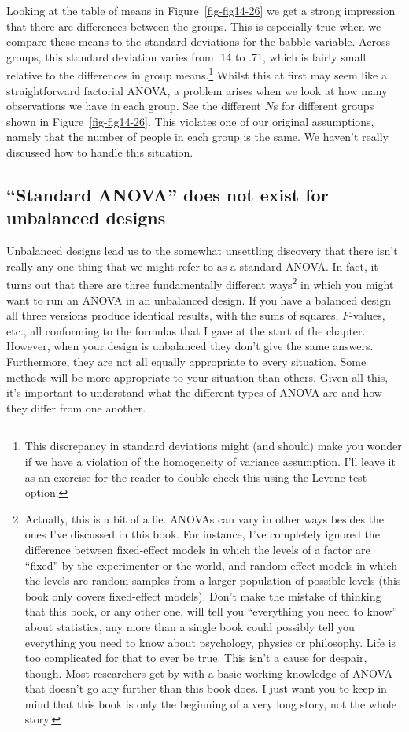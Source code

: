 \documentclass[
  a4paper,
]{book}
\begin{document}
Looking at the table of means in Figure~\ref{fig-fig14-26} we get a
strong impression that there are differences between the groups. This is
especially true when we compare these means to the standard deviations
for the babble variable. Across groups, this standard deviation varies
from .14 to .71, which is fairly small relative to the differences in
group means.\footnote{This discrepancy in standard deviations might (and
  should) make you wonder if we have a violation of the homogeneity of
  variance assumption. I'll leave it as an exercise for the reader to
  double check this using the Levene test option.} Whilst this at first
may seem like a straightforward factorial ANOVA, a problem arises when
we look at how many observations we have in each group. See the
different \(N\)s for different groups shown in
Figure~\ref{fig-fig14-26}. This violates one of our original
assumptions, namely that the number of people in each group is the same.
We haven't really discussed how to handle this situation.

\hypertarget{standard-anova-does-not-exist-for-unbalanced-designs}{%
\subsection{``Standard ANOVA'' does not exist for unbalanced
designs}\label{standard-anova-does-not-exist-for-unbalanced-designs}}

Unbalanced designs lead us to the somewhat unsettling discovery that
there isn't really any one thing that we might refer to as a standard
ANOVA. In fact, it turns out that there are three fundamentally
different ways\footnote{Actually, this is a bit of a lie. ANOVAs can
  vary in other ways besides the ones I've discussed in this book. For
  instance, I've completely ignored the difference between fixed-effect
  models in which the levels of a factor are ``fixed'' by the
  experimenter or the world, and random-effect models in which the
  levels are random samples from a larger population of possible levels
  (this book only covers fixed-effect models). Don't make the mistake of
  thinking that this book, or any other one, will tell you ``everything
  you need to know'' about statistics, any more than a single book could
  possibly tell you everything you need to know about psychology,
  physics or philosophy. Life is too complicated for that to ever be
  true. This isn't a cause for despair, though. Most researchers get by
  with a basic working knowledge of ANOVA that doesn't go any further
  than this book does. I just want you to keep in mind that this book is
  only the beginning of a very long story, not the whole story.} in
which you might want to run an ANOVA in an unbalanced design. If you
have a balanced design all three versions produce identical results,
with the sums of squares, \(F\)-values, etc., all conforming to the
formulas that I gave at the start of the chapter. However, when your
design is unbalanced they don't give the same answers. Furthermore, they
are not all equally appropriate to every situation. Some methods will be
more appropriate to your situation than others. Given all this, it's
important to understand what the different types of ANOVA are and how
they differ from one another.
\end{document}
